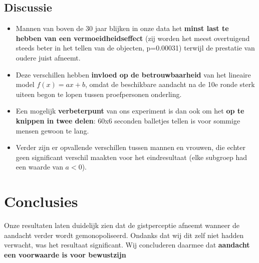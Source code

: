 \documentclass[a0,portrait]{a0poster}
\begin{document}
\begin{multicols}{3}
\subsection*{Discussie}
\begin{itemize}
\item Mannen van boven de 30 jaar blijken in onze data het \textbf{minst last te hebben van een vermoeidheidseffect} (zij worden het meest overtuigend steeds beter in het tellen van de objecten, p=0.00031) terwijl de prestatie van oudere juist afneemt.
\item Deze verschillen hebben \textbf{invloed op de betrouwbaarheid} van het lineaire model $f(x)=a x+b$, omdat de beschikbare aandacht na de 10e ronde sterk uiteen begon te lopen tussen proefpersonen onderling. 
\item Een mogelijk \textbf{verbeterpunt} van ons experiment is dan ook om het \textbf{op te knippen in twee delen}: 60x6 seconden balletjes tellen is voor sommige mensen gewoon te lang. 
\item Verder zijn er opvallende verschillen tussen mannen en vrouwen, die echter geen significant verschil maakten voor het eindresultaat (elke subgroep had een waarde van $a<0$).
\end{itemize}
\color{SaddleBrown} %
\section*{Conclusies}
\large Onze resultaten laten duidelijk zien dat de gistperceptie afneemt wanneer de aandacht verder wordt gemonopoliseerd. Ondanks dat wij dit zelf niet hadden verwacht, was het resultaat significant. Wij concluderen daarmee dat \textbf{aandacht een voorwaarde is voor bewustzijn}
\color{Black} %

















\end{multicols}
\end{document}
